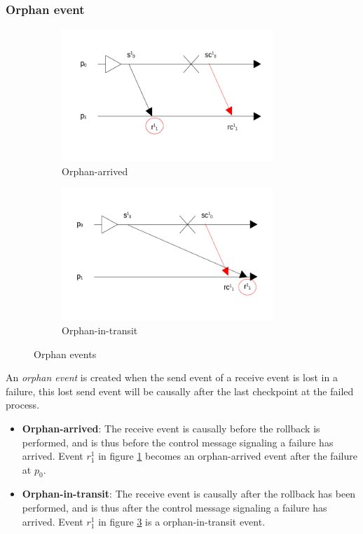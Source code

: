 \documentclass[twocolumn, a4paper,11pt]{article}%
\begin{document}
\subsubsection{Orphan event}
\begin{figure}[h]
	\centering
	\begin{subfigure}{8cm}
		\centering
		\includegraphics[width=8cm]{Orphan_arrived.png}
		\caption{Orphan-arrived}
		\label{fig:orphan_arrived}
	\end{subfigure}
	\begin{subfigure}{8cm}
		\centering
		\includegraphics[width=8cm]{Orphan_in_transit.png}
		\caption{Orphan-in-transit}
		\label{fig:orphan_transit}
	\end{subfigure}
	\caption{Orphan events}
\end{figure}
\par An \textit{orphan event} is created when the send event of a receive event is lost in a failure, this lost send event will be causally after the last checkpoint at the failed process. 
\begin{itemize}
	\item \textbf{Orphan-arrived}: The receive event is causally before the rollback is performed, and is thus before the control message signaling a failure has arrived. Event \(r^{1}_{1}\) in figure   \ref{fig:orphan_arrived} becomes an orphan-arrived event after the failure at \(p_{0}\).
	\item \textbf{Orphan-in-transit}: The receive event is causally after the rollback has been performed, and is thus after the control message signaling a failure has arrived. Event \(r^{1}_{1}\) in figure \ref{fig:orphan_transit} is a orphan-in-transit event.
\end{itemize}
\end{document}
